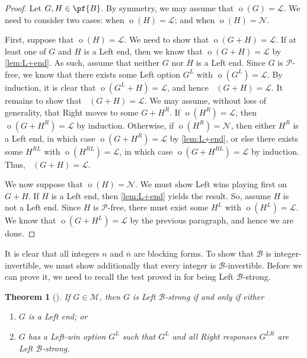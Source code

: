 \documentclass[11pt]{article}
\newtheorem{theorem}{Theorem}[section]
\theoremstyle{definition}
\DeclareMathOperator{\outcome}{o}
\DeclareMathOperator{\outcomeL}{o_L}
\DeclareMathOperator{\outcomeR}{o_R}
\newcommand{\set}[1]{\mathcal{#1}}
\begin{document}
\begin{proof}
    Let $G,H\in\pf{B}$. By symmetry, we may assume that
    $\outcome(G)=\mathscr{L}$. We need to consider two cases: when
    $\outcome(H)=\mathscr{L}$; and when $\outcome(H)=\mathscr{N}$.

    First, suppose that $\outcome(H)=\mathscr{L}$. We need to show that
    $\outcome(G+H)=\mathscr{L}$. If at least one of $G$ and $H$ is a Left end,
    then we know that $\outcome(G+H)=\mathscr{L}$ by \cref{lem:L+end}. As such,
    assume that neither $G$ nor $H$ is a Left end. Since $G$ is
    $\mathscr{P}$-free, we know that there exists some Left option $G^L$ with
    $\outcome(G^L)=\mathscr{L}$. By induction, it is clear that
    $\outcome(G^L+H)=\mathscr{L}$, and hence $\outcomeL(G+H)=\mathscr{L}$. It
    remains to show that $\outcomeR(G+H)=\mathscr{L}$. We may assume, without
    loss of generality, that Right moves to some $G+H^R$. If
    $\outcome(H^R)=\mathscr{L}$, then $\outcome(G+H^R)=\mathscr{L}$ by
    induction. Otherwise, if $\outcome(H^R)=\mathscr{N}$, then either $H^R$ is
    a Left end, in which case $\outcome(G+H^R)=\mathscr{L}$ by
    \cref{lem:L+end}, or else there exists some $H^{RL}$ with
    $\outcome(H^{RL})=\mathscr{L}$, in which case
    $\outcome(G+H^{RL})=\mathscr{L}$ by induction. Thus,
    $\outcomeR(G+H)=\mathscr{L}$.

    We now suppose that $\outcome(H)=\mathscr{N}$. We must show Left wins
    playing first on $G+H$. If $H$ is a Left end, then \cref{lem:L+end} yields
    the result. So, assume $H$ is not a Left end. Since $H$ is
    $\mathscr{P}$-free, there must exist some $H^L$ with
    $\outcome(H^L)=\mathscr{L}$. We know that $\outcome(G+H^L)=\mathscr{L}$ by
    the previous paragraph, and hence we are done.
\end{proof}

It is clear that all integers $n$ and $\overline{n}$ are blocking forms. To
show that $\set{B}$ is integer-invertible, we must show additionally that every
integer is $\set{B}$-invertible. Before we can prove it, we need to recall the
test proved in \cite{davies.milley:order} for being Left $\set{B}$-strong.

\begin{theorem}[{\cite[Theorem 3.1 on p.~9]{davies.milley:order}}]
    \label{thm:strong}
    If $G\in\set{M}$, then $G$ is Left $\set{B}$-strong if and only if either
    \begin{enumerate}
        \item
            $G$ is a Left end; or
        \item
            $G$ has a Left-win option $G^L$ such that $G^L$ and all Right
            responses $G^{LR}$ are Left $\set{B}$-strong.
    \end{enumerate}
\end{theorem}
\end{document}
